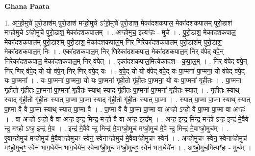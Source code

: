 \documentclass[17pt]{extarticle}
\begin{document}
\textbf{Ghana Paata } \newline

1. अꣳ॒॒हो॒मुचे॑ पुरो॒डाश॑म् पुरो॒डाश॑ मꣳहो॒मुचे ऽꣳ॑हो॒मुचे॑ पुरो॒डाश॒ मेका॑दशकपाल॒ मेका॑दशकपालम् पुरो॒डाश॑ मꣳहो॒मुचे ऽꣳ॑हो॒मुचे॑ पुरो॒डाश॒ मेका॑दशकपालम् । . अꣳ॒॒हो॒मुच॒ इत्यꣳ॑हः - मुचे᳚ । . पु॒रो॒डाश॒ मेका॑दशकपाल॒ मेका॑दशकपालम् पुरो॒डाश॑म् पुरो॒डाश॒ मेका॑दशकपाल॒म् निर् णिरेका॑दशकपालम् पुरो॒डाश॑म् पुरो॒डाश॒ मेका॑दशकपाल॒म् निः । . एका॑दशकपाल॒म् निर् णिरेका॑दशकपाल॒ मेका॑दशकपाल॒म् निर् व॑पेद् वपे॒न् निरेका॑दशकपाल॒ मेका॑दशकपाल॒म् निर् व॑पेत् । . एका॑दशकपाल॒मित्येका॑दश - क॒पा॒ल॒म् । . निर् व॑पेद् वपे॒न् निर् णिर् व॑पे॒द् यो यो व॑पे॒न् निर् णिर् व॑पे॒द् यः । . व॒पे॒द् यो यो व॑पेद् वपे॒द् यः पा॒प्मना॑ पा॒प्मना॒ यो व॑पेद् वपे॒द् यः पा॒प्मना᳚ । . यः पा॒प्मना॑ पा॒प्मना॒ यो यः पा॒प्मना॑ गृही॒तो गृ॑ही॒तः पा॒प्मना॒ यो यः पा॒प्मना॑ गृही॒तः । . पा॒प्मना॑ गृही॒तो गृ॑ही॒तः पा॒प्मना॑ पा॒प्मना॑ गृही॒तः स्याथ् स्याद् गृ॑ही॒तः पा॒प्मना॑ पा॒प्मना॑ गृही॒तः स्यात् । . गृ॒ही॒तः स्याथ् स्याद् गृ॑ही॒तो गृ॑ही॒तः स्यात् पा॒प्मा पा॒प्मा स्याद् गृ॑ही॒तो गृ॑ही॒तः स्यात् पा॒प्मा । . स्यात् पा॒प्मा पा॒प्मा स्याथ् स्यात् पा॒प्मा वै वै पा॒प्मा स्याथ् स्यात् पा॒प्मा वै । . पा॒प्मा वै वै पा॒प्मा पा॒प्मा वा अꣳहो ऽꣳहो॒ वै पा॒प्मा पा॒प्मा वा अꣳहः॑ । . वा अꣳहो ऽꣳहो॒ वै वा अꣳह॒ इन्द्र॒ मिन्द्र॒ मꣳहो॒ वै वा अꣳह॒ इन्द्र᳚म् । . अꣳह॒ इन्द्र॒ मिन्द्र॒ मꣳहो ऽꣳह॒ इन्द्र॑ मे॒वैवे न्द्र॒ मꣳहो ऽꣳह॒ इन्द्र॑ मे॒व । . इन्द्र॑ मे॒वैवे न्द्र॒ मिन्द्र॑ मे॒वाꣳहो॒मुच॑ मꣳहो॒मुच॑ मे॒वे न्द्र॒ मिन्द्र॑ मे॒वाꣳहो॒मुच᳚म् । . ए॒वाꣳहो॒मुच॑ मꣳहो॒मुच॑ मे॒वैवाꣳहो॒मुचꣳ॒॒ स्वेन॒ स्वेनाꣳ॑हो॒मुच॑ मे॒वैवाꣳ॑हो॒मुचꣳ॒॒ स्वेन॑ । . अꣳ॒॒हो॒मुचꣳ॒॒ स्वेन॒ स्वेनाꣳ॑हो॒मुच॑ मꣳहो॒मुचꣳ॒॒ स्वेन॑ भाग॒धेये॑न भाग॒धेये॑न॒ स्वेनाꣳ॑हो॒मुच॑ मꣳहो॒मुचꣳ॒॒ स्वेन॑ भाग॒धेये॑न । . अꣳ॒॒हो॒मुच॒मित्यꣳ॑हः - मुच᳚म् । \newline
\end{document}
